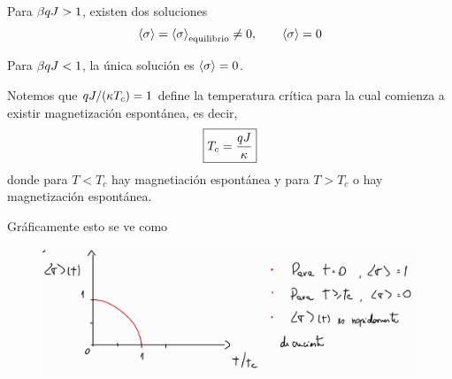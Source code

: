 Para $\beta qJ>1$, existen dos soluciones
\begin{equation}
  \ev{\s}=\ev{\s}_{\rm equilibrio}\neq 0,\qquad \ev{\s}=0
\end{equation}

Para $\beta qJ<1$, la única solución es $\ev{\s}=0$.

Notemos que $qJ/(\kappa T_c)=1$ define la temperatura crítica para la cual comienza a existir magnetización espontánea, es decir,
\begin{equation}
  \boxed{T_c=\frac{qJ}{\kappa }}
\end{equation}
donde para $T<T_c$ hay magnetiación espontánea y para $T>T_c$ o hay magnetización espontánea.

Gráficamente esto se ve como
\begin{figure}[h!]
	\centering
	\includegraphics[scale=0.4]{fig/31-es}
\end{figure}










































